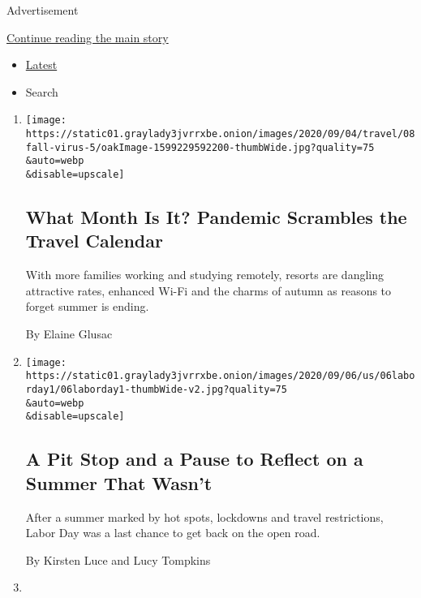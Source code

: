 Advertisement

\protect\hyperlink{after-mid2}{Continue reading the main story}

\begin{itemize}
\tightlist
\item
  \protect\hyperlink{stream-panel}{Latest}
\item
  Search
\end{itemize}

\begin{enumerate}
\def\labelenumi{\arabic{enumi}.}
\item
  \href{/2020/09/08/travel/fall-resorts-coronavirus.html}{}

  \texttt{[image: https://static01.graylady3jvrrxbe.onion/images/2020/09/04/travel/08fall-virus-5/oakImage-1599229592200-thumbWide.jpg?quality=75\\\&auto=webp\\\&disable=upscale]}

  \hypertarget{what-month-is-it-pandemic-scrambles-the-travel-calendar}{%
  \subsection{What Month Is It? Pandemic Scrambles the Travel
  Calendar}\label{what-month-is-it-pandemic-scrambles-the-travel-calendar}}

  With more families working and studying remotely, resorts are dangling
  attractive rates, enhanced Wi-Fi and the charms of autumn as reasons
  to forget summer is ending.

  By Elaine Glusac
\item
  \href{/2020/09/07/us/virus-laborday-travel-reststop-newjersey.html}{}

  \texttt{[image: https://static01.graylady3jvrrxbe.onion/images/2020/09/06/us/06laborday1/06laborday1-thumbWide-v2.jpg?quality=75\\\&auto=webp\\\&disable=upscale]}

  \hypertarget{a-pit-stop-and-a-pause-to-reflect-on-a-summer-that-wasnt}{%
  \subsection{A Pit Stop and a Pause to Reflect on a Summer That
  Wasn't}\label{a-pit-stop-and-a-pause-to-reflect-on-a-summer-that-wasnt}}

  After a summer marked by hot spots, lockdowns and travel restrictions,
  Labor Day was a last chance to get back on the open road.

  By Kirsten Luce and Lucy Tompkins
\item
  \href{/2020/09/05/at-home/visit-sculpture-gardens.html}{}


\end{enumerate}
